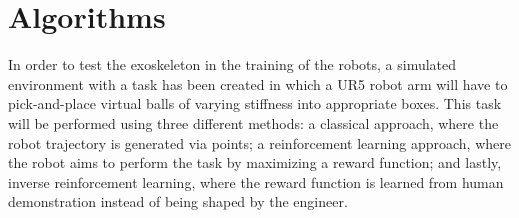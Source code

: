 \chapter{Algorithms}

In order to test the exoskeleton in the training of the robots, a simulated environment with a task has been created in which a UR5 robot arm will have to pick-and-place virtual balls of varying stiffness into appropriate boxes. This task will be performed using three different methods: a classical approach, where the robot trajectory is generated via points; a reinforcement learning approach, where the robot aims to perform the task by maximizing a reward function; and lastly, inverse reinforcement learning, where the reward function is learned from human demonstration instead of being shaped by the engineer.





